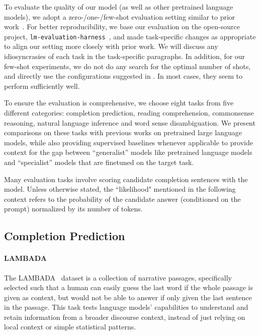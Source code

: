 \documentclass[11pt]{article}
\begin{document}
To evaluate the quality of our model (as well as other pretrained language models), we adopt a zero-/one-/few-shot evaluation setting similar to prior work~\citep{brown2020language,Rae2021Gopher}. For better reproducibility, we base our evaluation on the open-source project, {\texttt {lm-evaluation-harness}}~\citep{eval-harness}, and made task-specific changes as appropriate to align our setting more closely with prior work. We will discuss any idiosyncrasies of each task in the task-specific paragraphs. In addition, for our few-shot experiments, we do not do any search for the optimal number of shots, and directly use the configurations suggested in \cite{brown2020language}. In most cases, they seem to perform sufficiently well.

To ensure the evaluation is comprehensive, we choose eight tasks from five different categories: completion prediction, reading comprehension, commonsense reasoning, natural language inference and word sense disambiguation. We present comparisons on these tasks with previous works on pretrained large language models, while also providing supervised baselines whenever applicable to provide context for the gap between ``generalist'' models like pretrained language models and ``specialist'' models that are finetuned on the target task.

Many evaluation tasks involve scoring candidate completion sentences with the model. Unless otherwise stated, the ``likelihood" mentioned in the following context refers to the probability of the candidate answer (conditioned on the prompt) normalized by its number of tokens.

\subsection{Completion Prediction}

\paragraph{LAMBADA} The LAMBADA~\citep{paperno-etal-2016-lambada} dataset is a collection of narrative passages, specifically selected such that a human can easily guess the last word if the whole passage is given as context, but would not be able to answer if only given the last sentence in the passage. This task tests language models' capabilities to understand and retain information from a broader discourse context, instead of just relying on local context or simple statistical patterns.
\end{document}
